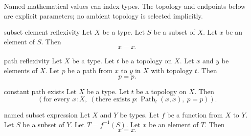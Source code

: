 Named mathematical values can index types. The topology and endpoints below
are explicit parameters; no ambient topology is selected implicitly.
\par

\begin{cleanresult}{subset element reflexivity}
Let $X$ be a type.
Let $S$ be a subset of $X$.
Let $x$ be an element of $S$.
Then \[x=x.\]
\end{cleanresult}

\begin{cleanresult}{path reflexivity}
Let $X$ be a type.
Let $t$ be a topology on $X$.
Let $x$ and $y$ be elements of $X$.
Let $p$ be a path from $x$ to $y$ in $X$ with topology $t$.
Then \[p=p.\]
\end{cleanresult}

\begin{cleanresult}{constant path exists}
Let $X$ be a type.
Let $t$ be a topology on $X$.
Then \[\left(\text{for every }x : X,\; \left(\text{there exists }p : \operatorname{Path}_{t}(x,x),\; p=p\right)\right).\]
\end{cleanresult}

\begin{cleanresult}{named subset expression}
Let $X$ and $Y$ be types.
Let $f$ be a function from $X$ to $Y$.
Let $S$ be a subset of $Y$.
Let $T = f^{-1}(S)$.
Let $x$ be an element of $T$.
Then \[x=x.\]
\end{cleanresult}

